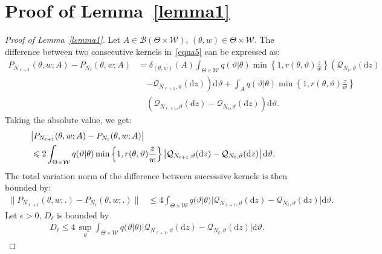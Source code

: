 \documentclass[pdflatex,sn-mathphys-num]{sn-jnl}
\renewcommand{\leq}{\leqslant}
\theoremstyle{thmstyleone}
\theoremstyle{thmstyletwo}
\theoremstyle{thmstylethree}
\begin{document}
\section{Proof of Lemma~\ref{lemma1}}
\label{appendixB}
\begin{proof}[Proof of Lemma~{\upshape\ref{lemma1}}]
Let $A \in \mathcal{B}(\Theta\times\mathcal{W})$, $(\theta, w )\in \Theta\times\mathcal{W}$. The difference between two consecutive kernels in~\eqref{equa5} can be expressed as:
{\small
\begin{align*}
    P_{N_{\ell+1}}(\theta,w ; A)-P_{N_{\ell}}(\theta,w ; A) &= \delta_{(\theta,w)}(A) \int_{\Theta \times \mathcal{W}} q(\vartheta|\theta) \min\left\{1,  r(\theta, \vartheta) \frac{z}{w}\right\} \left(\mathcal{Q}_{N_{\ell},\vartheta}(\mathrm{d}z)\right.\\
    &\quad \left.- \mathcal{Q}_{N_{\ell+1},\vartheta}(\mathrm{d}z) \right) \mathrm{d} \vartheta 
    + \int_A q(\vartheta|\theta) \min\left\{1,  r(\theta, \vartheta) \frac{z}{w}\right\} \\    &\quad \left(\mathcal{Q}_{N_{\ell+1},\vartheta}(\mathrm{d}z)- \mathcal{Q}_{N_{\ell},\vartheta}(\mathrm{d}z) \right) \mathrm{d} \vartheta.
\end{align*}
}
Taking the absolute value, we get:
{\small
\begin{align*}
    \lefteqn{\left|P_{N_{\ell+1}}(\theta,w ; A)-P_{N_{\ell}}(\theta,w ; A)\right|} \\
    &\leq 2 \int_{\Theta \times \mathcal{W}} q(\vartheta|\theta) \min\left\{1,  r(\theta, \vartheta) \frac{z}{w}\right\} 
    \left| \mathcal{Q}_{N_{\ell+1},\vartheta}(\mathrm{d}z) - \mathcal{Q}_{N_{\ell},\vartheta}(\mathrm{d}z) \right| \mathrm{d} \vartheta.
\end{align*}
}
The total variation norm of the difference between successive kernels is then bounded by:
{\small
\begin{align*}
    \|P_{N_{\ell+1}}(\theta,w ; .)-P_{N_{\ell}}(\theta,w ; .)\| &\leq 4 \int_{\Theta \times \mathcal{W}} q(\vartheta|\theta)  |\mathcal{Q}_{N_{\ell+1},\vartheta}(\mathrm{d}z)- \mathcal{Q}_{N_{\ell},\vartheta}(\mathrm{d}z)| \mathrm{d} \vartheta.
\end{align*}}
Let $\epsilon>0$, $D_\ell$ is bounded by
{\small
\begin{align*}
    D_\ell \leq 4 \, \underset{\theta}{\sup} \int_{\Theta \times \mathcal{W}} q(\vartheta|\theta)  |\mathcal{Q}_{N_{\ell+1},\vartheta}(\mathrm{d}z)- \mathcal{Q}_{N_{\ell},\vartheta}(\mathrm{d}z)| \mathrm{d} \vartheta.
\end{align*}}

\end{proof}
\end{document}
